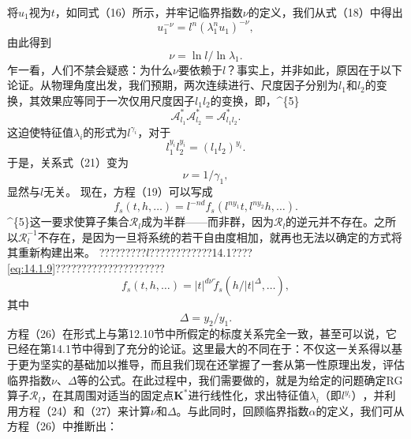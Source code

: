 将\(u_{1}\)视为\(t\)，如同式（16）所示，并牢记临界指数\(\nu\)的定义，我们从式（18）中得出
\begin{equation}\tag{14.3.15}\label{eq:14.3.15}
u _ { 1 } ^{- \nu} = l ^{n} ( \lambda _ { 1 } ^{n} u _ { 1 } ) ^{- \nu} ,
\end{equation}
由此得到
\begin{equation}\tag{14.3.16}\label{eq:14.3.16}
\nu = \ln l / \ln \lambda _ { 1 } .
\end{equation}
乍一看，人们不禁会疑惑：为什么\(\nu\)要依赖于\(l\)？事实上，并非如此，原因在于以下论证。从物理角度出发，我们预期，两次连续进行、尺度因子分别为\(l_{1}\)和\(l_{2}\)的变换，其效果应等同于一次仅用尺度因子\(l_{1}l_{2}\)的变换，即，\^{}\{5\}
\begin{equation}\tag{14.3.17}\label{eq:14.3.17}
\mathcal { A } _ { l _ { 1 } } ^{*} \mathcal { A } _ { l _ { 2 } } ^{*} = \mathcal { A } _ { l _ { 1 } l _ { 2 } } ^{*} .
\end{equation}
这迫使特征值\(\lambda_{i}\)的形式为\(l^{\gamma_{i}}\)，对于
\begin{equation}\tag{14.3.18}\label{eq:14.3.18}
l _ { 1 } ^{y _ { i} } l _ { 2 } ^{y _ { i} } = ( l _ { 1 } l _ { 2 } ) ^{y _ { i} } .
\end{equation}
于是，关系式（21）变为
\begin{equation}\tag{14.3.19}\label{eq:14.3.19}
\nu = 1 / \gamma _ { 1 } ,
\end{equation}
显然与\(l\)无关。
现在，方程（19）可以写成
\begin{equation}\tag{14.3.20}\label{eq:14.3.20}
f _ { s } ( t , h , \ldots ) = l ^{- n d} f _ { s } ( l ^{n y _ { 1} } t , l ^{n y _ { 2} } h , \ldots ) .
\end{equation}
\^{}\{5\}这一要求使算子集合\(\mathcal{R}_{l}\)成为半群——而非群，因为\(\mathcal{R}_{l}\)的逆元并不存在。之所以\(\mathcal{R}_{l}^{-1}\)不存在，是因为一旦将系统的若干自由度相加，就再也无法以确定的方式将其重新构建出来。
?????????\(l\)????????????14.1????\autoref{eq:14.1.9}?????????????????????
\begin{equation}\tag{14.3.21}\label{eq:14.3.21}
f _ { s } ( t , h , \ldots ) = | t | ^{d \nu} \tilde { f } _ { s } ( h / | t | ^{\Delta} , \ldots ) ,
\end{equation}
其中
\begin{equation}\tag{14.3.22}\label{eq:14.3.22}
\Delta = y _ { 2 } / y _ { 1 } .
\end{equation}
方程（26）在形式上与第12.10节中所假定的标度关系完全一致，甚至可以说，它已经在第14.1节中得到了充分的论证。这里最大的不同在于：不仅这一关系得以基于更为坚实的基础加以推导，而且我们现在还掌握了一套从第一性原理出发，评估临界指数\(\nu\)、\(\Delta\)等的公式。在此过程中，我们需要做的，就是为给定的问题确定RG算子\(\mathcal{R}_l\)，在其周围对适当的固定点\(\mathbf{K}^*\)进行线性化，求出特征值\(\lambda_i\)（即\(l^{y_i}）\)，并利用方程（24）和（27）来计算\(\nu\)和\(\Delta\)。与此同时，回顾临界指数\(\alpha\)的定义，我们可从方程（26）中推断出：
